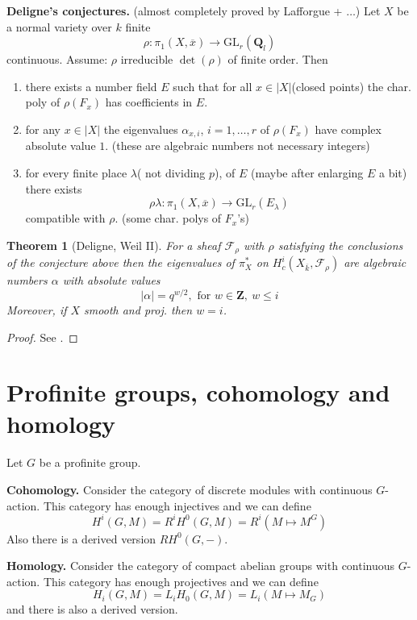 \documentclass{stacks-project}
\theoremstyle{plain}
\newtheorem{theorem}[subsection]{Theorem}
\theoremstyle{definition}
\theoremstyle{remark}
\numberwithin{equation}{subsection}
\begin{document}
\medskip\noindent
{\bf Deligne's conjectures.} (almost completely proved by
Lafforgue + $\ldots$) Let $X$ be a normal variety over $k$ finite
$$
\rho : \pi_1(X, \overline{x}) \longrightarrow \text{GL}_r(\mathbf{Q}_l)
$$
continuous. Assume: $\rho$ irreducible $\det(\rho)$ of finite order. Then
\begin{enumerate}
\item there exists a number field $E$ such that for all $x\in
|X|$(closed points) the char. poly of $\rho(F_x)$ has coefficients in $E$.
\item for any $x\in |X|$ the eigenvalues $\alpha_{x, i}$, $i = 1, \ldots,
r$ of $\rho(F_x)$ have complex absolute value $1$.
(these are algebraic numbers not necessary integers)
\item for every finite place $\lambda$( not dividing $p$), of $E$
(maybe after enlarging $E$ a bit) there exists
$$
\rho\lambda : \pi_1(X, \overline{x}) \to \text{GL}_r(E_\lambda)
$$
compatible with $\rho$. (some char. polys of $F_x$'s)
\end{enumerate}

\begin{theorem}[Deligne, Weil II]
\label{theorem-weil-II}
For a sheaf
$\mathcal{F}_\rho$ with $\rho$ satisfying the conclusions of the conjecture
above then the eigenvalues of $\pi_X^*$ on $H_c^i(X_{\overline{k}},
\mathcal{F}_{\rho})$ are algebraic numbers $\alpha$ with absolute values
$$
|\alpha|=q^{w/2}, \text{ for }w\in \mathbf{Z},\ w\leq i
$$
Moreover, if $X$ smooth and proj. then $w = i$.
\end{theorem}

\begin{proof}
See \cite{WeilII}.
\end{proof}




\section{Profinite groups, cohomology and homology}
\label{section-profinite-cohomology}

\noindent
Let $G$ be a profinite group.

\medskip\noindent
{\bf Cohomology.}
Consider the category of discrete modules with continuous $G$-action.
This category has enough injectives and we can define
$$
H^i(G, M) = R^iH^0(G, M) = R^i(M\mapsto M^G)
$$
Also there is a derived version $RH^0(G, -)$.

\medskip\noindent
{\bf Homology.}
Consider the category of compact abelian groups with continuous $G$-action.
This category has enough projectives and we can define
$$
H_i(G, M) = L_iH_0(G, M)=L_i(M\mapsto M_G)
$$
and there is also a derived version.
\end{document}
